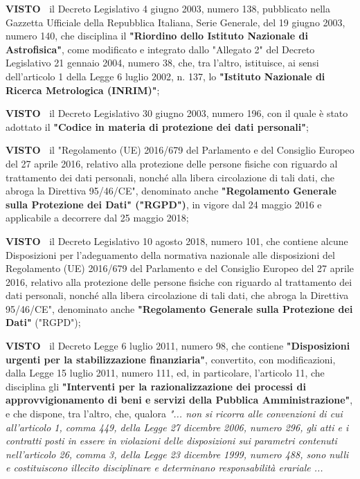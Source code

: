 \textbf{VISTO~}	il Decreto Legislativo 4 giugno 2003, numero 138,
pubblicato nella Gazzetta Ufficiale della Repubblica Italiana, Serie
Generale, del 19 giugno 2003, numero 140, che disciplina il \textbf{"Riordino
dello Istituto Nazionale di Astrofisica"}, come modificato e integrato
dallo "Allegato 2" del Decreto Legislativo 21 gennaio 2004, numero 38,
che, tra l'altro, istituisce, ai sensi dell'articolo 1 della Legge
6 luglio 2002, n. 137, lo \textbf{"Istituto Nazionale di Ricerca Metrologica
(INRIM)"};

\textbf{VISTO~}	il Decreto Legislativo 30 giugno 2003, numero 196, con
il quale è stato adottato il \textbf{"Codice in materia di protezione dei dati
personali"};

\textbf{VISTO~}	il "Regolamento (UE) 2016/679 del Parlamento e del
Consiglio Europeo del 27 aprile 2016, relativo alla protezione delle
persone fisiche con riguardo al trattamento dei dati personali, nonché
alla libera circolazione di tali dati, che abroga la Direttiva 95/46/CE",
denominato anche \textbf{"Regolamento Generale sulla Protezione dei Dati"
("RGPD")}, in vigore dal 24 maggio 2016 e applicabile a decorrere dal 25
maggio 2018;

\textbf{VISTO~}	il Decreto Legislativo 10 agosto 2018, numero 101,
che contiene alcune Disposizioni per l'adeguamento della normativa
nazionale alle disposizioni del Regolamento (UE) 2016/679 del Parlamento
e del Consiglio Europeo del 27 aprile 2016, relativo alla protezione
delle persone fisiche con riguardo al trattamento dei dati personali,
nonché alla libera circolazione di tali dati, che abroga la Direttiva
95/46/CE", denominato anche \textbf{"Regolamento Generale sulla Protezione dei
Dati"} ("RGPD");

\textbf{VISTO~}	il Decreto Legge 6 luglio 2011, numero 98, che contiene
\textbf{"Disposizioni urgenti per la stabilizzazione finanziaria"}, convertito,
con modificazioni, dalla Legge 15 luglio 2011, numero 111, ed, in
particolare, l'articolo 11, che disciplina gli \textbf{"Interventi per la
razionalizzazione dei processi di approvvigionamento di beni e servizi
della Pubblica Amministrazione"}, e che dispone, tra l'altro, che,
qualora \textit{"... non si ricorra alle convenzioni di cui all'articolo
1, comma 449, della Legge 27 dicembre 2006, numero 296, gli atti e i
contratti posti in essere in violazioni delle disposizioni sui parametri
contenuti nell'articolo 26, comma 3, della Legge 23 dicembre 1999,
numero 488, sono nulli e costituiscono illecito disciplinare e determinano
responsabilità erariale ...}

